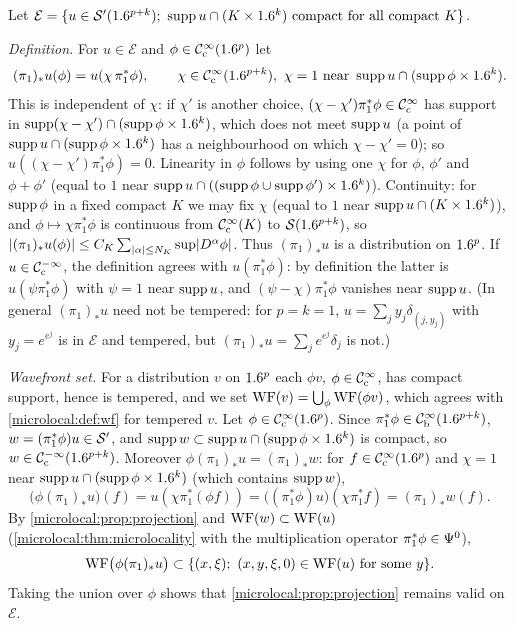 \subsection*{}
Let $\mathcal E=\{u\in\cSp(\R^{p+k});\ \supp u\cap(K\times\R^k)\text{ compact for all compact }K\}$.

\emph{Definition.} For $u\in\mathcal E$ and $\phi\in\mathcal{C}^\infty_{\mathrm{c}}(1.6^p)$ let
\begin{equation*}
  (\pi_1)_*u(\phi)=u(\chi\,\pi_1^*\phi),\qquad\chi\in\CIc(\R^{p+k}),\ \chi=1\text{ near }
  \supp u\cap(\supp\phi\times\R^k).
\end{equation*}
This is independent of $\chi$: if $\chi'$ is another choice, $(\chi-\chi')\pi_1^*\phi\in\mathcal{C}^\infty_{\mathrm{c}}$ has
support in $\operatorname{supp}(\chi-\chi')\cap(\operatorname{supp}\phi\times1.6^k)$, which does not meet $\operatorname{supp} u$ (a point of
$\operatorname{supp} u\cap(\operatorname{supp}\phi\times1.6^k)$ has a neighbourhood on which $\chi-\chi'=0$); so
$u((\chi-\chi')\pi_1^*\phi)=0$. Linearity in $\phi$ follows by using one $\chi$ for
$\phi$, $\phi'$ and $\phi+\phi'$ (equal to $1$ near $\operatorname{supp} u\cap((\operatorname{supp}\phi\cup\operatorname{supp}\phi')\times1.6^k)$).
Continuity: for $\operatorname{supp}\phi$ in a fixed compact $K$ we may fix $\chi$ (equal to $1$ near
$\operatorname{supp} u\cap(K\times1.6^k)$), and $\phi\mapsto\chi\pi_1^*\phi$ is continuous from $\mathcal{C}^\infty_{\mathrm{c}}(K)$ to
$\mathcal{S}(1.6^{p+k})$, so $\lvert (\pi_1)_*u(\phi)\rvert\le C_K\sum_{\lvert \alpha\rvert\le N_K}\sup\lvert D^\alpha\phi\rvert$. Thus
$(\pi_1)_*u$ is a distribution on $1.6^p$. If $u\in\mathcal{C}^{-\infty}_{\mathrm{c}}$, the definition agrees with
$u(\pi_1^*\phi)$: by definition the latter is $u(\psi\pi_1^*\phi)$ with $\psi=1$ near $\operatorname{supp} u$, and
$(\psi-\chi)\pi_1^*\phi$ vanishes near $\operatorname{supp} u$. (In general $(\pi_1)_*u$ need not be tempered:
for $p=k=1$, $u=\sum_jy_j\delta_{(j,y_j)}$ with $y_j=e^{e^j}$ is in $\mathcal E$ and tempered, but
$(\pi_1)_*u=\sum_je^{e^j}\delta_j$ is not.)

\emph{Wavefront set.} For a distribution $v$ on $1.6^p$ each $\phi v$, $\phi\in\mathcal{C}^\infty_{\mathrm{c}}$, has compact
support, hence is tempered, and we set $\operatorname{WF}(v)=\bigcup_\phi\operatorname{WF}(\phi v)$, which agrees with
\cref{microlocal:def:wf} for tempered $v$. Let $\phi\in\mathcal{C}^\infty_{\mathrm{c}}(1.6^p)$. Since $\pi_1^*\phi\in\mathcal{C}^\infty_{\mathrm{b}}(1.6^{p+k})$,
$w=(\pi_1^*\phi)u\in\mathcal{S}'$, and $\operatorname{supp} w\subset\operatorname{supp} u\cap(\operatorname{supp}\phi\times1.6^k)$ is compact, so
$w\in\mathcal{C}^{-\infty}_{\mathrm{c}}(1.6^{p+k})$. Moreover $\phi(\pi_1)_*u=(\pi_1)_*w$: for $f\in\mathcal{C}^\infty_{\mathrm{c}}(1.6^p)$ and $\chi=1$ near
$\operatorname{supp} u\cap(\operatorname{supp}\phi\times1.6^k)$ (which contains $\operatorname{supp} w$),
\begin{equation*}
  \bigl(\phi(\pi_1)_*u\bigr)(f)=u(\chi\pi_1^*(\phi f))=\bigl((\pi_1^*\phi)u\bigr)(\chi\pi_1^*f)=(\pi_1)_*w(f).
\end{equation*}
By \cref{microlocal:prop:projection} and $\operatorname{WF}(w)\subset\operatorname{WF}(u)$ (\cref{microlocal:thm:microlocality}
with the multiplication operator $\pi_1^*\phi\in\Psi^{0}$),
\begin{equation*}
  \WF\bigl(\phi(\pi_1)_*u\bigr)\subset\{(x,\xi);\ (x,y,\xi,0)\in\WF(u)\text{ for some }y\}.
\end{equation*}
Taking the union over $\phi$ shows that \cref{microlocal:prop:projection} remains valid on
$\mathcal E$.

